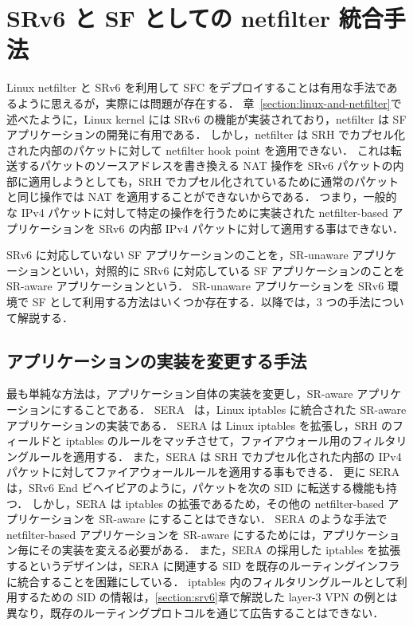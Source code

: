 \section{SRv6 と SF としての netfilter 統合手法}
\label{section:netfilter-as-nf}
Linux netfilter と SRv6 を利用して SFC をデプロイすることは有用な手法であるように思えるが，実際には問題が存在する．
章~\ref*{section:linux-and-netfilter}で述べたように，Linux kernel には SRv6 の機能が実装されており，netfilter は SF アプリケーションの開発に有用である．
しかし，netfilter は SRH でカプセル化された内部のパケットに対して netfilter hook point を適用できない．
これは転送するパケットのソースアドレスを書き換える NAT 操作を SRv6 パケットの内部に適用しようとしても，SRH でカプセル化されているために通常のパケットと同じ操作では NAT を適用することができないからである．
つまり，一般的な IPv4 パケットに対して特定の操作を行うために実装された netfilter-based アプリケーションを SRv6 の内部 IPv4 パケットに対して適用する事はできない．

SRv6 に対応していない SF アプリケーションのことを，SR-unaware アプリケーションといい，対照的に SRv6 に対応している SF アプリケーションのことを SR-aware アプリケーションという．
SR-unaware アプリケーションを SRv6 環境で SF として利用する方法はいくつか存在する．以降では，3 つの手法について解説する．

\subsection*{アプリケーションの実装を変更する手法}
\label{sbsection:change-impl}
最も単純な方法は，アプリケーション自体の実装を変更し，SR-aware アプリケーションにすることである．
SERA~\cite{sera} は，Linux iptables に統合された SR-aware アプリケーションの実装である．
SERA は Linux iptables を拡張し，SRH のフィールドと iptables のルールをマッチさせて，ファイアウォール用のフィルタリングルールを適用する．
また，SERA は SRH でカプセル化された内部の IPv4 パケットに対してファイアウォールルールを適用する事もできる．
更に SERA は，SRv6 End ビヘイビアのように，パケットを次の SID に転送する機能も持つ．
しかし，SERA は iptables の拡張であるため，その他の netfilter-based アプリケーションを SR-aware にすることはできない．
SERA のような手法で netfilter-based アプリケーションを SR-aware にするためには，アプリケーション毎にその実装を変える必要がある．
また，SERA の採用した iptables を拡張するというデザインは，SERA に関連する SID を既存のルーティングインフラに統合することを困難にしている．
iptables 内のフィルタリングルールとして利用するための SID の情報は，\ref*{section:srv6}章で解説した layer-3 VPN の例とは異なり，既存のルーティングプロトコルを通じて広告することはできない．

